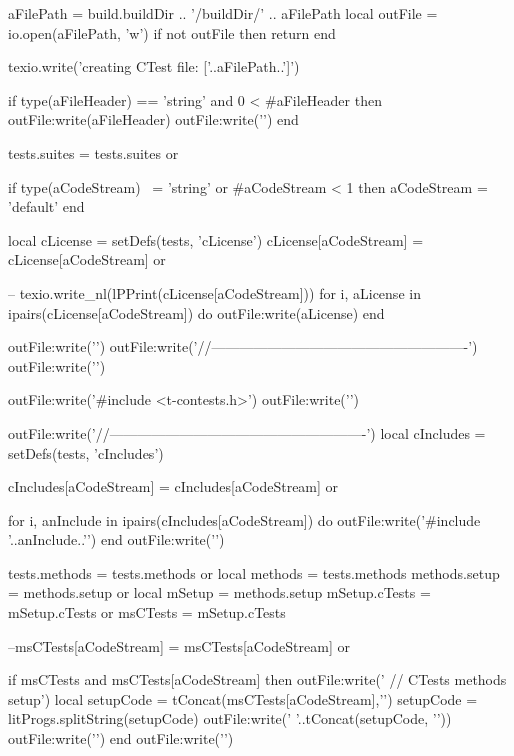   aFilePath = build.buildDir .. '/buildDir/' .. aFilePath
  local outFile = io.open(aFilePath, 'w')
  if not outFile then
    return
  end

  texio.write('creating CTest file: ['..aFilePath..']\n')

  if type(aFileHeader) == 'string'
    and 0 < #aFileHeader then
    outFile:write(aFileHeader)
    outFile:write('\n\n')
  end

  tests.suites = tests.suites or { }

  if type(aCodeStream) ~= 'string'
    or #aCodeStream < 1 then
    aCodeStream = 'default'
  end

  local cLicense = setDefs(tests, 'cLicense')
  cLicense[aCodeStream] = cLicense[aCodeStream] or { }

--  texio.write_nl(lPPrint(cLicense[aCodeStream]))
  for i, aLicense in ipairs(cLicense[aCodeStream]) do
    outFile:write(aLicense)
  end

  outFile:write('\n\n')
  outFile:write('//-------------------------------------------------------\n')
  outFile:write('\n\n')

  outFile:write('#include <t-contests.h>\n')
  outFile:write('\n\n')

  outFile:write('//-------------------------------------------------------\n')
  local cIncludes = setDefs(tests, 'cIncludes')

  cIncludes[aCodeStream] = cIncludes[aCodeStream] or { }

  for i, anInclude in ipairs(cIncludes[aCodeStream]) do
    outFile:write('#include '..anInclude..'\n')
  end
  outFile:write('\n\n')

  tests.methods = tests.methods or { }
  local methods = tests.methods
  methods.setup = methods.setup or { }
  local mSetup  = methods.setup
  mSetup.cTests = mSetup.cTests or { }
  msCTests      = mSetup.cTests

  --msCTests[aCodeStream] = msCTests[aCodeStream] or { }

  if msCTests and
    msCTests[aCodeStream] then
    outFile:write('  // CTests methods setup\n')
    local setupCode = tConcat(msCTests[aCodeStream],'\n')
    setupCode       = litProgs.splitString(setupCode)
    outFile:write('  '..tConcat(setupCode, '\n  '))
    outFile:write('\n\n')
  end
  outFile:write('\n\n')

